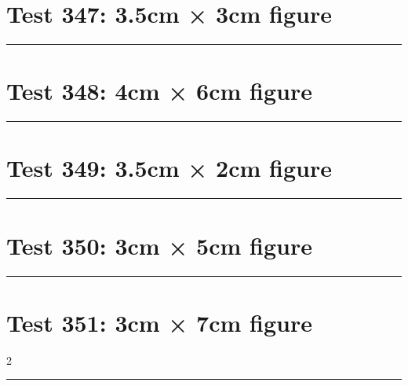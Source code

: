 \documentclass[a4paper,11pt]{article}
\begin{document}
\section*{Test 347: 3.5cm × 3cm figure}
\begin{swarmwrap}%
  \begin{minipage}[t]{3cm}
    \centering
    \rule{\linewidth}{3cm}
  \end{minipage}%
\end{swarmwrap}%
\swarmwrapnext
\lipsum[126]
\lipsum[127]
\lipsum[128]
\lipsum[129]
\lipsum[130]
\section*{Test 348: 4cm × 6cm figure}
\begin{swarmwrap}%
  \begin{minipage}[t]{4cm}
    \centering
    \rule{\linewidth}{6cm}
  \end{minipage}%
\end{swarmwrap}%
\swarmwrapnext
\lipsum[58]
\lipsum[59]
\lipsum[60]
\section*{Test 349: 3.5cm × 2cm figure}
\begin{swarmwrap}%
  \begin{minipage}[t]{3cm}
    \centering
    \rule{\linewidth}{2cm}
  \end{minipage}%
\end{swarmwrap}%
\swarmwrapnext
\lipsum[54]
\lipsum[55]
\lipsum[56]
\section*{Test 350: 3cm × 5cm figure}
\begin{swarmwrap}%
  \begin{minipage}[t]{3cm}
    \centering
    \rule{\linewidth}{5cm}
  \end{minipage}%
\end{swarmwrap}%
\swarmwrapnext
\lipsum[67]
\lipsum[68]
\lipsum[69]
\lipsum[70]
\section*{Test 351: 3cm × 7cm figure}
\begin{multicols}{2}
  \begin{swarmwrap}%
    \begin{minipage}[t]{3cm}
      \centering
      \rule{\linewidth}{7cm}
    \end{minipage}%
  \end{swarmwrap}%
  \swarmwrapnext
  \lipsum[3]
  \lipsum[4]
  \lipsum[5]
\end{multicols}
\end{document}
